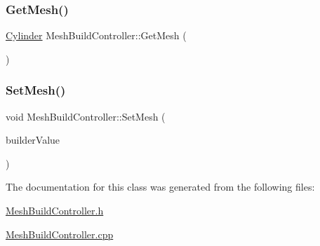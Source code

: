 \mbox{\label{class_mesh_build_controller_af2cef7d3c8a83ca7c206487fc5eb682e}} 
\subsubsection{\texorpdfstring{GetMesh()}{GetMesh()}}
{\footnotesize\ttfamily \mbox{\hyperlink{class_cylinder}{Cylinder}} Mesh\+Build\+Controller\+::\+Get\+Mesh (\begin{DoxyParamCaption}{ }\end{DoxyParamCaption})}

\mbox{\label{class_mesh_build_controller_aa08c7701786d5123c3fff36dcc1887b7}} 
\subsubsection{\texorpdfstring{SetMesh()}{SetMesh()}}
{\footnotesize\ttfamily void Mesh\+Build\+Controller\+::\+Set\+Mesh (\begin{DoxyParamCaption}\item[{\mbox{\hyperlink{class_mesh_builder}{Mesh\+Builder}} $\ast$}]{builder\+Value }\end{DoxyParamCaption})}



The documentation for this class was generated from the following files\+:\begin{DoxyCompactItemize}
\item 
\mbox{\hyperlink{_mesh_build_controller_8h}{Mesh\+Build\+Controller.\+h}}\item 
\mbox{\hyperlink{_mesh_build_controller_8cpp}{Mesh\+Build\+Controller.\+cpp}}\end{DoxyCompactItemize}
